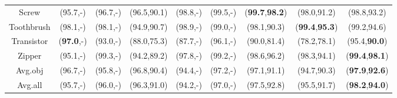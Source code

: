 \documentclass[5p, twocolumn]{elsarticle}[draft]
\begin{document}
\begin{table*}[h]
\begin{tabular}{ccccccccc}
Screw & (95.7,-) & (96.7,-) & (96.5,90.1) & (98.8,-) & (99.5,-) & (\textbf{99.7},\textbf{98.2}) & (98.0,91.2) & (98.8,93.2) \\
Toothbrush & (98.1,-) & (98.1,-) & (94.9,90.7) & (98.9,-) & (99.0,-) & (98.1,90.3) & (\textbf{99.4},\textbf{95.3}) & (99.2,94.6) \\
Transistor & (\textbf{97.0},-) & (93.0,-) & (88.0,75.3) & (87.7,-) & (96.1,-) & (90.0,81.4) & (78.2,78.1) & (95.4,\textbf{90.0}) \\
Zipper & (95.1,-) & (99.3,-) & (94.2,89.2) & (97.8,-) & (99.2,-) & (98.6,96.2) & (98.3,94.1) & (\textbf{99.4},\textbf{98.1}) \\ \hline
Avg.obj & (96.7,-) & (95.8,-) & (96.8,90.4) & (94.4,-) & (97.2,-) & (97.1,91.1) & (94.7,90.3) & (\textbf{97.9},\textbf{92.6}) \\ \hline
Avg.all & (95.7,-) & (96.0,-) & (96.3,91.0) & (94.2,-) & (97.0,-) & (97.5,92.8) & (95.5,91.7) & (\textbf{98.2},\textbf{94.0}) \\ \hline
\end{tabular}
\end{table*}
\end{document}
